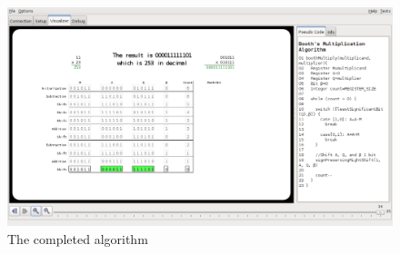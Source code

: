 \documentclass{article}
\begin{document}
\begin{figure}[h]
\centering
\includegraphics[scale=0.3]{finish.pdf}
\caption{The completed algorithm}
\end{figure}
\end{document}
